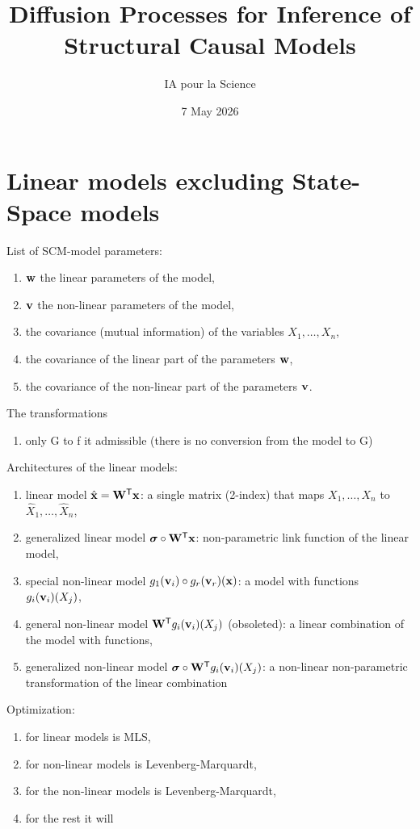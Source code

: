 \documentclass[12pt]{article}
\title{Diffusion Processes for Inference of Structural Causal Models}
\author{IA pour la Science}
\date{7 May 2026}
\begin{document}
\maketitle

\section{Linear models excluding State-Space models}

List of SCM-model parameters:
\begin{enumerate}
\item[] $\mathbf{w}$ the linear parameters of the model,
\item[] $\mathbf{v}$ the non-linear parameters of the model,
\item[] the covariance (mutual information) of the variables $X_1,\dots,X_n$,
\item the covariance of the linear part of the parameters $\mathbf{w}$,
\item the covariance of the non-linear part of the parameters $\mathbf{v}$.
\end{enumerate}

The transformations
\begin{enumerate}
    \item only G to f it admissible (there is no conversion from the model to G)
\end{enumerate}

Architectures of the linear models:
\begin{enumerate}
    \item linear model $\hat{\mathbf{x}}=\mathbf{W}^{\mathsf{T}}\mathbf{x}$: a single matrix (2-index) that maps $X_1,\dots,X_n$ to $\hat{X}_1,\dots,\hat{X}_n$,
    \item generalized linear model ${\boldsymbol{\sigma}}\circ\mathbf{W}^{\mathsf{T}}\mathbf{x}$: non-parametric link function of the linear model,
    \item special non-linear model $g_1(\mathbf{v}_i) \circ g_r(\mathbf{v}_r)(\mathbf{x})$: a model with functions $g_i(\mathbf{v}_i)(X_j)$,
    \item general non-linear model $\mathbf{W}^{\mathsf{T}} g_i(\mathbf{v}_i)(X_j)$ (obsoleted): a linear combination of the  model with functions,
    \item generalized non-linear model  ${\boldsymbol{\sigma}} \circ \mathbf{W}^{\mathsf{T}} g_i(\mathbf{v}_i)(X_j)$: a non-linear non-parametric transformation of the linear combination
\end{enumerate}

Optimization:
\begin{enumerate}
\item for linear models is MLS,
\item for non-linear models is Levenberg-Marquardt,
\item for the non-linear models is Levenberg-Marquardt,
\item for the rest it will 
\end{enumerate}
\end{document}
